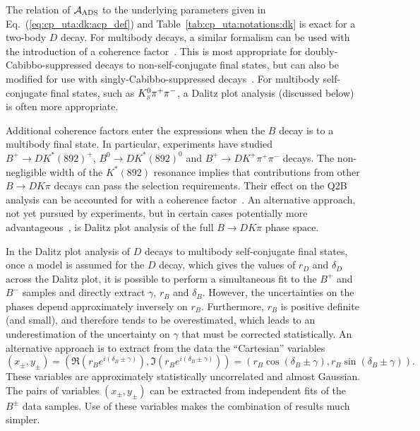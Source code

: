 The relation of ${\cal A}_{\rm ADS}$ to the underlying parameters given in Eq.~(\ref{eq:cp_uta:dk:acp_def}) and Table~\ref{tab:cp_uta:notations:dk} is exact for a two-body $D$ decay.  
For multibody decays, a similar formalism can be used with the introduction of a coherence factor~\cite{Atwood:2003mj}.
This is most appropriate for doubly-Cabibbo-suppressed decays to non-self-conjugate final states, but can also be modified for use with singly-Cabibbo-suppressed decays~\cite{Grossman:2002aq}.
For multibody self-conjugate final states, such as $K^0_{\scriptscriptstyle S}\pi^+\pi^-$, a Dalitz plot analysis (discussed below) is often more appropriate.

Additional coherence factors enter the expressions when the $B$ decay is to a multibody final state.
In particular, experiments have studied $B^+ \to DK^*(892)^+$, $B^0 \to DK^*(892)^0$ and $B^+ \to DK^+\pi^+\pi^-$ decays.
The non-negligible width of the $K^*(892)$ resonance implies that contributions from other $B \to DK\pi$ decays can pass the selection requirements.
Their effect on the Q2B analysis can be accounted for with a coherence factor~\cite{Gronau:2002mu}.
An alternative approach, not yet pursued by experiments, but in certain cases potentially more advantageous~\cite{Gershon:2008pe,Gershon:2009qc}, is Dalitz plot analysis of the full $B \to DK\pi$ phase space.

In the Dalitz plot analysis of $D$ decays to multibody self-conjugate final states,
once a model is assumed for the $D$ decay, 
which gives the values of $r_D$ and $\delta_D$ across the Dalitz plot,
it is possible to perform a simultaneous fit to the $B^+$ and $B^-$ samples 
and directly extract $\gamma$, $r_B$ and $\delta_B$.
However, the uncertainties on the phases depend approximately inversely on $r_B$.
Furthermore, $r_B$ is positive definite (and small), 
and therefore tends to be overestimated,
which leads to an underestimation of the uncertainty on $\gamma$ that must be
corrected statistically. %
An alternative approach is to extract from the data the ``Cartesian''
variables
\begin{equation}
  \left( x_\pm, y_\pm \right) = 
  \left( \Re(r_B e^{i(\delta_B\pm\gamma)}), \Im(r_B e^{i(\delta_B\pm\gamma)}) \right) = 
  \left( r_B \cos(\delta_B\pm\gamma), r_B \sin(\delta_B\pm\gamma) \right).
\end{equation}
These variables are approximately statistically uncorrelated and almost Gaussian.
The pairs of variables $\left( x_\pm, y_\pm \right)$ can be extracted
from independent fits of the $B^\pm$ data samples.
Use of these variables makes the combination of results much simpler.

